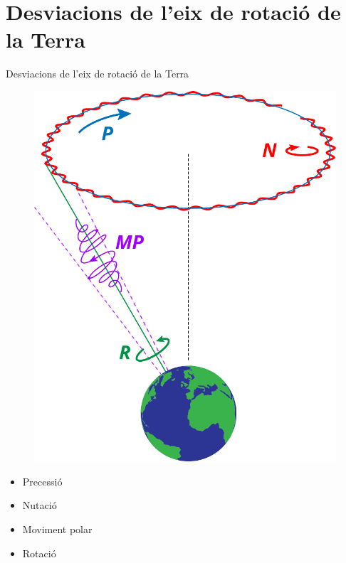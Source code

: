 \documentclass{beamer} %
\begin{document}
\section{Desviacions de l'eix de rotació de la Terra}
\begin{frame}{Desviacions de l'eix de rotació de la Terra}
  \begin{minipage}{0.49\textwidth}
    \begin{figure}
      \centering
      \includegraphics[width=\textwidth]{../Images/precession_nutation_ca.pdf}
    \end{figure}
  \end{minipage}
  \begin{minipage}{0.49\textwidth}
    \begin{itemize}
      \item \textcolor[RGB]{0,113,188}{{Precessió}}
      \item \textcolor[RGB]{255,0,0}{{Nutació}}
      \item \textcolor[RGB]{158,0,255}{{Moviment polar}}
      \item \textcolor[RGB]{0,146,70}{{Rotació}}

\end{itemize}
\end{minipage}
\end{frame}
\end{document}
